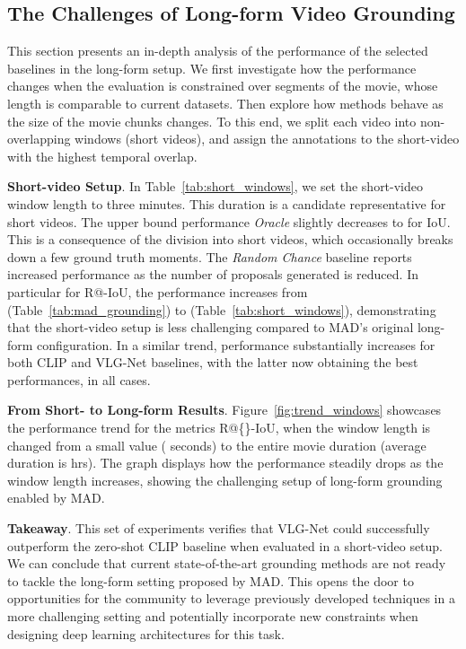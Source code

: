 \documentclass[10pt,twocolumn,letterpaper]{article}
\renewcommand{\paragraph}[1]{\vspace{1mm}\noindent\textbf{#1}.}
\begin{document}
\subsection{The Challenges of Long-form Video Grounding}
This section presents an in-depth analysis of the performance of the selected baselines in the long-form setup. We first investigate how the performance changes when the evaluation is constrained over segments of the movie, whose length is comparable to current datasets. Then explore how methods behave as the size of the movie chunks changes. To this end, we split each video into non-overlapping windows (short videos), and assign the annotations to the short-video with the highest temporal overlap. 

\paragraph{Short-video Setup}
In Table~\ref{tab:short_windows}, we set the short-video window length to three minutes. This duration is a candidate representative for short videos.
The upper bound performance \textit{Oracle} slightly decreases to  for IoU. This is a consequence of the division into short videos, which occasionally breaks down a few ground truth moments. The \textit{Random Chance} baseline reports increased performance as the number of proposals generated is reduced. In particular for R@-IoU, the performance increases from  (Table~\ref{tab:mad_grounding}) to  (Table~\ref{tab:short_windows}), demonstrating that the short-video setup is less challenging compared to MAD's original long-form configuration. In a similar trend, performance substantially increases for both CLIP and VLG-Net baselines, with the latter now obtaining the best performances, in all cases.

\paragraph{From Short- to Long-form Results}
Figure~\ref{fig:trend_windows} showcases the performance trend for the metrics R@\{\}-IoU, when  the window length is changed from a small value ( seconds) to the entire movie duration (average duration is hrs). The graph displays how the performance steadily drops as the window length increases, showing the challenging setup of long-form grounding enabled by MAD. 

\paragraph{Takeaway}
This set of experiments verifies that VLG-Net could successfully outperform the zero-shot CLIP baseline  when evaluated in a short-video setup.  We can conclude that current state-of-the-art grounding methods are not ready to tackle the long-form setting proposed by MAD. This opens the door to opportunities for the community to leverage previously developed techniques in a more challenging setting and potentially incorporate new constraints when designing deep learning architectures for this task. 
\end{document}
